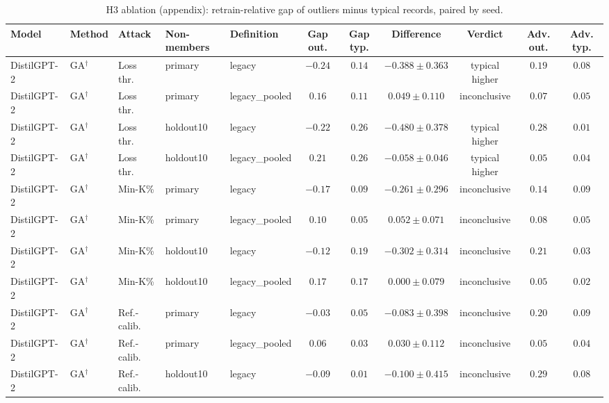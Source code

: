 \begin{table}[t]
\centering
\caption{H3 ablation (appendix): retrain-relative gap of outliers minus typical records, paired by seed.}
\label{tab:h3-ablation}
\footnotesize
\renewcommand{\arraystretch}{1.2}
\setlength{\tabcolsep}{2pt}
\begin{tabular*}{\textwidth}{@{\extracolsep{\fill}}lllllcccccc@{}}
\toprule
\textbf{Model} & \textbf{Method} & \textbf{Attack} & \textbf{Non-members} & \textbf{Definition} & \textbf{Gap out.} & \textbf{Gap typ.} & \textbf{Difference} & \textbf{Verdict} & \textbf{Adv. out.} & \textbf{Adv. typ.} \\
\midrule
DistilGPT-2 & GA$^{\dagger}$ & Loss thr. & primary & legacy & $-0.24$ & $0.14$ & $-0.388 \pm 0.363$ & typical higher & $0.19$ & $0.08$ \\
DistilGPT-2 & GA$^{\dagger}$ & Loss thr. & primary & legacy\_pooled & $0.16$ & $0.11$ & $0.049 \pm 0.110$ & inconclusive & $0.07$ & $0.05$ \\
DistilGPT-2 & GA$^{\dagger}$ & Loss thr. & holdout10 & legacy & $-0.22$ & $0.26$ & $-0.480 \pm 0.378$ & typical higher & $0.28$ & $0.01$ \\
DistilGPT-2 & GA$^{\dagger}$ & Loss thr. & holdout10 & legacy\_pooled & $0.21$ & $0.26$ & $-0.058 \pm 0.046$ & typical higher & $0.05$ & $0.04$ \\
DistilGPT-2 & GA$^{\dagger}$ & Min-K\% & primary & legacy & $-0.17$ & $0.09$ & $-0.261 \pm 0.296$ & inconclusive & $0.14$ & $0.09$ \\
DistilGPT-2 & GA$^{\dagger}$ & Min-K\% & primary & legacy\_pooled & $0.10$ & $0.05$ & $0.052 \pm 0.071$ & inconclusive & $0.08$ & $0.05$ \\
DistilGPT-2 & GA$^{\dagger}$ & Min-K\% & holdout10 & legacy & $-0.12$ & $0.19$ & $-0.302 \pm 0.314$ & inconclusive & $0.21$ & $0.03$ \\
DistilGPT-2 & GA$^{\dagger}$ & Min-K\% & holdout10 & legacy\_pooled & $0.17$ & $0.17$ & $0.000 \pm 0.079$ & inconclusive & $0.05$ & $0.02$ \\
DistilGPT-2 & GA$^{\dagger}$ & Ref.-calib. & primary & legacy & $-0.03$ & $0.05$ & $-0.083 \pm 0.398$ & inconclusive & $0.20$ & $0.09$ \\
DistilGPT-2 & GA$^{\dagger}$ & Ref.-calib. & primary & legacy\_pooled & $0.06$ & $0.03$ & $0.030 \pm 0.112$ & inconclusive & $0.05$ & $0.04$ \\
DistilGPT-2 & GA$^{\dagger}$ & Ref.-calib. & holdout10 & legacy & $-0.09$ & $0.01$ & $-0.100 \pm 0.415$ & inconclusive & $0.29$ & $0.08$ \\

\end{tabular*}
\end{table}
